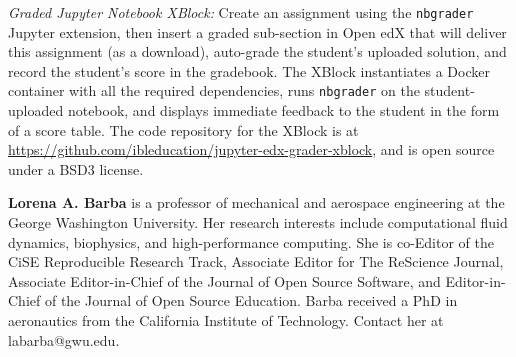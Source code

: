 \documentclass[10pt,journal,compsoc]{IEEEtran}
\begin{document}
\emph{Graded Jupyter Notebook XBlock:} Create an assignment using the \texttt{nbgrader} Jupyter extension, then insert a graded sub-section in Open edX that will deliver this assignment (as a download), auto-grade the student's uploaded solution, and record the student's score in the gradebook. 
The XBlock instantiates a Docker container with all the required dependencies, runs \texttt{nbgrader} on the student-uploaded notebook, and displays immediate feedback to the student in the form of a score table. 
The code repository for the XBlock is at \url{https://github.com/ibleducation/jupyter-edx-grader-xblock}, and is open source under a BSD3 license.

\bigskip

\textbf{Lorena A. Barba} is a professor of mechanical and aerospace engineering at the George Washington University. Her research interests include computational fluid dynamics, biophysics, and high-performance computing. She is co-Editor of the CiSE Reproducible Research Track, Associate Editor for The ReScience Journal, Associate Editor-in-Chief of the Journal of Open Source Software, and Editor-in-Chief of the Journal of Open Source Education. Barba received a PhD in aeronautics from the California Institute of Technology. Contact her at labarba@gwu.edu.



%
\end{document}
